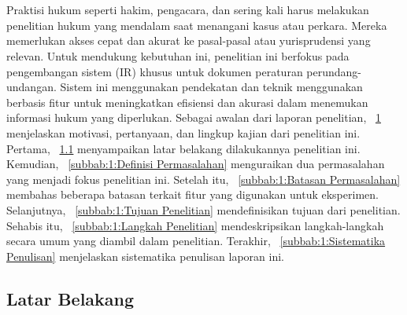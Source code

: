 \chapter{\babSatu}
\label{bab:1}
Praktisi hukum seperti hakim, pengacara, dan \paralegal{} sering kali harus melakukan penelitian hukum yang mendalam saat menangani kasus atau perkara. Mereka memerlukan akses cepat dan akurat ke pasal-pasal atau yurisprudensi yang relevan. Untuk mendukung kebutuhan ini, penelitian ini berfokus pada pengembangan sistem \ir{} (IR) khusus untuk dokumen peraturan perundang-undangan. Sistem ini menggunakan pendekatan \cascaded{} \retrieval{} dan teknik \reranking{} menggunakan \reranker{} berbasis fitur untuk meningkatkan efisiensi dan akurasi dalam menemukan informasi hukum yang diperlukan. Sebagai awalan dari laporan penelitian, \subbab{}~\ref{bab:1} menjelaskan motivasi, pertanyaan, dan lingkup kajian dari penelitian ini. Pertama, \subbab{}~\ref{subbab:1:Latar Belakang} menyampaikan latar belakang dilakukannya penelitian ini. Kemudian, \subbab{}~\ref{subbab:1:Definisi Permasalahan} menguraikan dua permasalahan yang menjadi fokus penelitian ini. Setelah itu, \subbab{}~\ref{subbab:1:Batasan Permasalahan} membahas beberapa batasan terkait fitur yang digunakan untuk eksperimen. Selanjutnya, \subbab{}~\ref{subbab:1:Tujuan Penelitian} mendefinisikan tujuan dari penelitian. Sehabis itu, \subbab{}~\ref{subbab:1:Langkah Penelitian} mendeskripsikan langkah-langkah secara umum yang diambil dalam penelitian. Terakhir, \subbab{}~\ref{subbab:1:Sistematika Penulisan} menjelaskan sistematika penulisan laporan ini.





\section{Latar Belakang}
\label{subbab:1:Latar Belakang}

